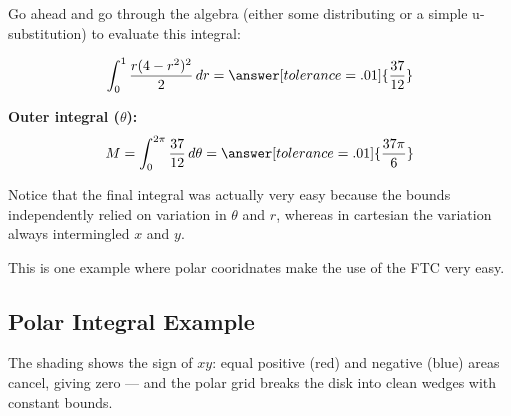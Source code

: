 \documentclass{ximera}
\begin{document}
\begin{problem}
Go ahead and go through the algebra (either some distributing or a simple u-substitution) to evaluate this integral:

$$\int_0^1 \frac{r(4-r^2)^2}{2}\,dr=\answer[tolerance=.01]{\frac{37}{12}}$$

\textbf{Outer integral ($\theta$):}
$$M = \int_0^{2\pi} \frac{37}{12}\,d\theta = \answer[tolerance=.01]{\frac{37\pi}{6}}$$

Notice that the final integral was actually very easy because the bounds independently relied on variation in $\theta$ and $r$, whereas in cartesian the variation always intermingled $x$ and $y$.

This is one example where polar cooridnates make the use of the FTC very easy.
\end{problem}


\subsection*{Polar Integral Example}


The shading shows the sign of $xy$: equal positive (red) and negative (blue) areas cancel, giving zero --- and the polar grid breaks the disk into clean wedges with constant bounds.
\end{document}
